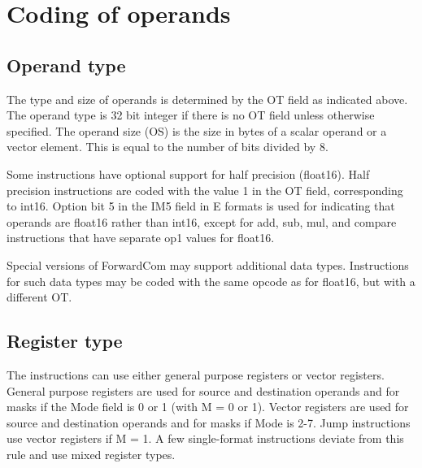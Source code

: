 \documentclass[forwardcom.tex]{subfiles}
\begin{document}

\vv
\section{Coding of operands}
\subsection{Operand type}
The type and size of operands is determined by the OT field as indicated above. The operand type is 32 bit integer if there is no OT field unless otherwise specified. The operand size (OS) is the size in bytes of a scalar operand or a vector element. This is equal to the number of bits divided by 8.
\vv

Some instructions have optional support for half precision (float16). Half precision instructions are coded with the value 1 in the OT field, corresponding to int16. Option bit 5 in the IM5 field in E formats is used for indicating that operands are float16 rather than int16, except for add, sub, mul, and compare instructions that have separate op1 values for float16.
\vv

Special versions of ForwardCom may support additional data types. Instructions for such data types may be coded with the same opcode as for float16, but with a different OT.
\vv

\subsection{Register type}
The instructions can use either general purpose registers or vector registers. General purpose registers are used for source and destination operands and for masks if the Mode field is 0 or 1 (with M = 0 or 1). Vector registers are used for source and destination operands and for masks if Mode is 2-7. Jump instructions use vector registers if M = 1. A few single-format instructions deviate from this rule and use mixed register types.
\vv
\end{document}
